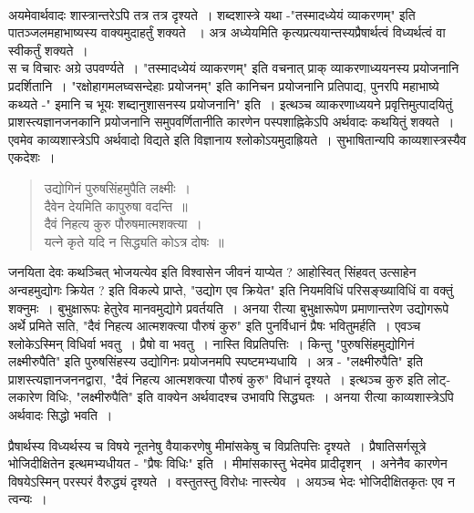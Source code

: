 {~\\[0.2cm]
अयमेवार्थवादः शास्त्रान्तरेऽपि तत्र तत्र दृश्यते~। शब्दशास्त्रे यथा  -"तस्मादध्येयं व्याकरणम्" इति पातञ्जलमहाभाष्यस्य वाक्यमुदाहर्तुं शक्यते ~। अत्र अध्येयमिति कृत्यप्रत्ययान्तस्य\break प्रैषार्थत्वं विध्यर्थत्वं वा स्वीकर्तुं शक्यते~। 
~\\[0.4cm]
स च विचारः अग्रे उपवर्ण्यते~। "तस्मादध्येयं व्याकरणम्" इति वचनात् प्राक् व्याकरणाध्ययनस्य प्रयोजनानि प्रदर्शितानि~। "रक्षोहागमलघ्वसन्देहाः प्रयोजनम्" इति कानिचन प्रयोजनानि प्रतिपाद्य, पुनरपि महाभाष्ये कथ्यते -" इमानि च भूयः शब्दानुशासनस्य प्रयोजनानि" इति~। इत्थञ्च व्याकरणाध्ययने प्रवृत्तिमुत्पादयितुं प्राशस्त्यज्ञानजनकानि प्रयोजनानि समुपवर्णितानीति कारणेन पस्पशाह्निकेऽपि अर्थवादः कथयितुं शक्यते~। 
~\\[0.2cm]
एवमेव काव्यशास्त्रेऽपि अर्थवादो विद्यते इति विज्ञानाय श्लोकोऽयमुदाह्रियते~। सुभाषितान्यपि काव्यशास्त्रस्यैव एकदेशः~। 
\begin{verse}
उद्योगिनं पुरुषसिंहमुपैति लक्ष्मीः~। \\
दैवेन देयमिति कापुरुषा वदन्ति~॥\\
दैवं निहत्य कुरु पौरुषमात्मशक्त्या~। \\
यत्ने कृते यदि न सिद्ध्यति कोऽत्र दोषः~॥
\end{verse}
जनयिता देवः कथञ्चित् भोजयत्येव इति विश्वासेन जीवनं याप्येत ? आहोस्वित्  सिंहवत् उत्साहेन अन्वहमुद्योगः क्रियेत ? इति विकल्पे प्राप्ते, "उद्योग एव क्रियेत" इति नियमविधिं परिसङ्ख्याविधिं वा वक्तुं शक्नुमः~। बुभुक्षारूपः हेतुरेव मानवमुद्योगे प्रवर्तयति~। अनया रीत्या बुभुक्षारूपेण प्रमाणान्तरेण उद्योगरूपे अर्थे प्रमिते सति, "दैवं निहत्य आत्मशक्त्या पौरुषं कुरु" इति पुनर्विधानं प्रैषः भवितुमर्हति~। एवञ्च श्लोकेऽस्मिन् विधिर्वा भवतु~। प्रैषो वा भवतु~। नास्ति विप्रतिपत्तिः~। किन्तु "पुरुषसिंहमुद्योगिनं लक्ष्मीरुपैति" इति पुरुषसिंहस्य उद्योगिनः प्रयोजनमपि स्पष्टमभ्यधायि~। अत्र - "लक्ष्मीरुपैति" इति प्राशस्त्यज्ञानजननद्वारा, "दैवं निहत्य आत्मशक्त्या पौरुषं कुरु" विधानं दृश्यते~। इत्थञ्च कुरु इति लोट्-लकारेण विधिः, "लक्ष्मीरुपैति" इति वाक्येन अर्थवादश्च उभावपि सिद्ध्यतः~। अनया रीत्या काव्यशास्त्रेऽपि अर्थवादः सिद्धो भवति~। 
\vskip 8pt

प्रैषार्थस्य विध्यर्थस्य च विषये नूतनेषु वैयाकरणेषु मीमांसकेषु च विप्रतिपत्तिः दृश्यते~। प्रैषातिसर्गसूत्रे भोजिदीक्षितेन इत्थमभ्यधीयत - "प्रैषः विधिः" इति~। मीमांसकास्तु भेदमेव प्रादीदृशन्~। अनेनैव कारणेन विषयेऽस्मिन् परस्परं वैरुद्ध्यं दृश्यते~। वस्तुतस्तु विरोधः नास्त्येव~। अयञ्च भेदः भोजिदीक्षितकृतः एव न त्वन्यः~। 
\vskip 8pt

}
